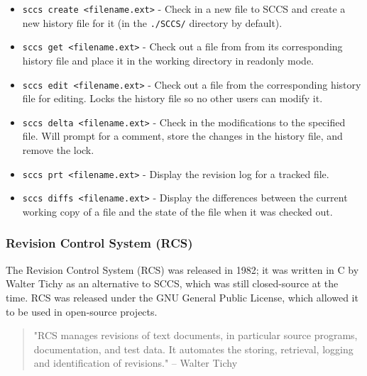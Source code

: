 \begin{itemize}
    \item \lstinline{sccs create <filename.ext>} - Check in a new file to SCCS and create a new history file for it (in the \lstinline{./SCCS/} directory by default).
    \item \lstinline{sccs get <filename.ext>} - Check out a file from from its corresponding history file and place it in the working directory in readonly mode.
    \item \lstinline{sccs edit <filename.ext>} - Check out a file from the corresponding history file for editing. Locks the history file so no other users can modify it.
    \item \lstinline{sccs delta <filename.ext>} - Check in the modifications to the specified file. Will prompt for a comment, store the changes in the history file, and remove the lock.
    \item \lstinline{sccs prt <filename.ext>} - Display the revision log for a tracked file.
    \item \lstinline{sccs diffs <filename.ext>} - Display the differences between the current working copy of a file and the state of the file when it was checked out.
\end{itemize}

\subsubsection{Revision Control System (RCS)}
The Revision Control System (RCS) was released in 1982; it was written in C by Walter Tichy as an alternative to SCCS, which was still closed-source at the time. RCS was released under the GNU General Public License, which allowed it to be used in open-source projects.

\begin{quote}
    "RCS manages revisions of text documents, in particular source programs, documentation, and test data. It automates the storing, retrieval, logging and identification of revisions." -- Walter Tichy \cite{tichy_1985}
\end{quote}

